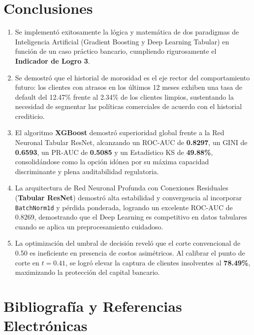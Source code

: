 \documentclass[11pt,a4paper]{article}
\begin{document}
\section{Conclusiones}

\begin{enumerate}[leftmargin=1.2cm]
    \item Se implementó exitosamente la lógica y matemática de dos paradigmas de Inteligencia Artificial (Gradient Boosting y Deep Learning Tabular) en función de un caso práctico bancario, cumpliendo rigurosamente el \textbf{Indicador de Logro 3}.
    \item Se demostró que el historial de morosidad es el eje rector del comportamiento futuro: los clientes con atrasos en los últimos 12 meses exhiben una tasa de default del 12.47\% frente al 2.34\% de los clientes limpios, sustentando la necesidad de segmentar las políticas comerciales de acuerdo con el historial crediticio.
    \item El algoritmo \textbf{XGBoost} demostró superioridad global frente a la Red Neuronal Tabular ResNet, alcanzando un ROC-AUC de \textbf{0.8297}, un GINI de \textbf{0.6593}, un PR-AUC de \textbf{0.5085} y un Estadístico KS de \textbf{49.88\%}, consolidándose como la opción idónea por su máxima capacidad discriminante y plena auditabilidad regulatoria.
    \item La arquitectura de Red Neuronal Profunda con Conexiones Residuales (\textbf{Tabular ResNet}) demostró alta estabilidad y convergencia al incorporar \texttt{BatchNorm1d} y pérdida ponderada, logrando un excelente ROC-AUC de 0.8269, demostrando que el Deep Learning es competitivo en datos tabulares cuando se aplica un preprocesamiento cuidadoso.
    \item La optimización del umbral de decisión reveló que el corte convencional de 0.50 es ineficiente en presencia de costos asimétricos. Al calibrar el punto de corte en $t = 0.41$, se logró elevar la captura de clientes insolventes al \textbf{78.49\%}, maximizando la protección del capital bancario.
\end{enumerate}

\section{Bibliografía y Referencias Electrónicas}
\end{document}
